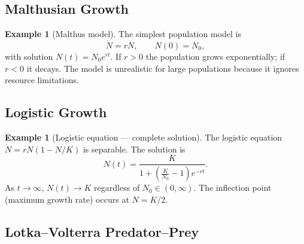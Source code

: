 \documentclass[12pt,a4paper,openany]{book}
\theoremstyle{definition}
\newtheorem{example}[definition]{Example}
\theoremstyle{plain}
\theoremstyle{remark}
\begin{document}
\subsection{Malthusian Growth}
\label{subsec:malthus}

\begin{example}[Malthus model]
\label{ex:malthus}
The simplest population model is
\[
  \dot{N} = rN, \qquad N(0)=N_{0},
\]
with solution $N(t)=N_{0}e^{rt}$. If $r>0$ the population grows
exponentially; if $r<0$ it decays. The model is unrealistic for large
populations because it ignores resource limitations.
\end{example}

\subsection{Logistic Growth}
\label{subsec:logistic-growth}

\begin{example}[Logistic equation --- complete solution]
\label{ex:logistic-full}
The logistic equation $\dot{N}=rN(1-N/K)$ is separable. The solution
is
\[
  N(t) = \frac{K}{1+\left(\frac{K}{N_{0}}-1\right)e^{-rt}}.
\]
As $t\to\infty$, $N(t)\to K$ regardless of $N_{0}\in(0,\infty)$.
The inflection point (maximum growth rate) occurs at $N=K/2$.
\end{example}

\begin{center}
\end{center}

\subsection{Lotka--Volterra Predator--Prey}
\label{subsec:lotka-volterra-app}
\end{document}
